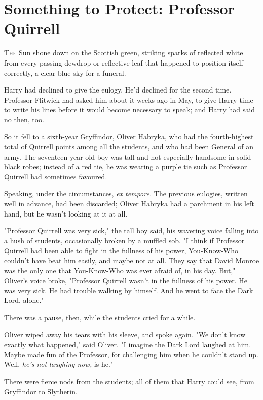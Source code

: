 \chapter{Something to Protect: Professor Quirrell}

\lettrine{T}{he} Sun shone
down on the Scottish green, striking sparks of reflected white from every
passing dewdrop or reflective leaf that happened to position itself correctly,
a clear blue sky for a funeral.

Harry had declined to give the eulogy. He'd declined for the second time.
Professor Flitwick had asked him about it weeks ago in May, to give Harry time
to write his lines before it would become necessary to speak; and Harry had
said no then, too.

So it fell to a sixth-year Gryffindor, Oliver Habryka, who had the
fourth-highest total of Quirrell points among all the students, and who had
been General of an army. The seventeen-year-old boy was tall and not especially
handsome in solid black robes; instead of a red tie, he was wearing a purple
tie such as Professor Quirrell had sometimes favoured.

Speaking, under the circumstances, \emph{ex tempore.} The previous eulogies,
written well in advance, had been discarded; Oliver Habryka had a parchment in
his left hand, but he wasn't looking at it at all.

"Professor Quirrell was very sick," the tall boy said, his wavering voice
falling into a hush of students, occasionally broken by a muffled sob. "I think
if Professor Quirrell had been able to fight in the fullness of his power,
You-Know-Who couldn't have beat him easily, and maybe not at all. They say that
David Monroe was the only one that You-Know-Who was ever afraid of, in his day.
But," Oliver's voice broke, "Professor Quirrell wasn't in the fullness of his
power. He was very sick. He had trouble walking by himself. And he went to face
the Dark Lord, alone."

There was a pause, then, while the students cried for a while.

Oliver wiped away his tears with his sleeve, and spoke again. "We don't know
exactly what happened," said Oliver. "I imagine the Dark Lord laughed at him.
Maybe made fun of the Professor, for challenging him when he couldn't stand up.
Well, \emph{he's not laughing now,} is he."

There were fierce nods from the students; all of them that Harry could see,
from Gryffindor to Slytherin.

